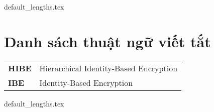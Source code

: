 \documentclass[class=report, crop=false]{standalone}
\begin{document}
	{default_lengths.tex}
	\baselineskip
	\chapter*{Danh sách thuật ngữ viết tắt}
	\begin{tabu}{>{\large\bfseries}m{2cm} >{\large}X[l]}
		HIBE	&	Hierarchical Identity-Based Encryption 		\\
		IBE		&	Identity-Based Encryption 					\\

	\end{tabu}
	\newpage
	{default_lengths.tex}
\end{document}
